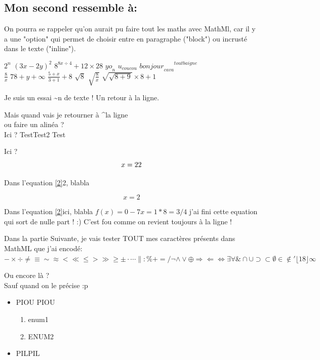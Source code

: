 \documentclass[10pt,a4paper]{report}
\begin{document}
\subsection{Mon second ressemble à:}


On pourra se rappeler qu'on aurait pu faire tout les maths avec MathMl, car il y a une "option" qui permet de choisir entre en paragraphe ("block") ou incrusté dans le texte ("inline").

$ 2^n $
$ (3x - 2y)^2 $
$ 8^{8x \div 4} + 12 \times 28 $
$ {yo}_n $
$ u_{coucou} $
$ {{bonjour}_{ca va}}^{tout baigne} $
\\
$ \frac{8}{x} $
$ 78+y+\infty $
$ \frac{5+x}{3+1} + 8 $
$ \sqrt{8}$
$ \sqrt{\frac{8}{x}}$
$ \sqrt{\sqrt{8+9}} \times 8 +1 $

Je suis un essai \textasciitilde n de texte !
Un retour à la ligne.

\jambonGros


Mais quand vais je retourner à \textasciicircum la ligne\\ ou faire un alinéa ?\\
Ici ? Test\newline Test2
Test

Ici ?
\begin{equation}
x = 2 \label*{2}
\end{equation}

Dans l'equation \ref{2}{2}, blabla


\begin{equation*}
x = 2
\end{equation*}

Dans l'equation \ref{2}{ici}, blabla \(f(x) = 0 -7x = 1 * 8 = 3 /4 \) j'ai fini cette equation qui sort de nulle part ! :)  C'est fou comme on revient toujours à la ligne !

Dans la partie Suivante, je vais tester TOUT mes caractères présents dans MathML que j'ai encodé: \( - \times \div \neq \equiv \sim \approx < \ll \leq > \gg \geq \pm \cdot \cdots \| : \% + = /
 \neg \wedge \vee \oplus \Rightarrow \Leftarrow \Leftrightarrow \exists \forall \&
\cap \cup \supset \subset \emptyset \in \notin
\prime \lfloor 18 \rfloor \infty
\)

Ou encore là ? \\Sauf quand on le précise :p

\begin{itemize}
\item PIOU PIOU
\begin{enumerate}
\item enum1
\item ENUM2
\end{enumerate}
\item PILPIL
\end{itemize}
\end{document}
